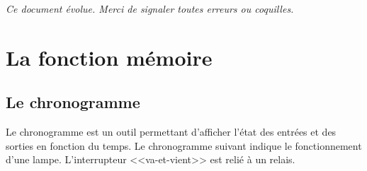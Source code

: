 \documentclass[10pt]{article}
\begin{document}

\setlength{\parskip}{0ex plus 0.2ex minus 0ex}
 \renewcommand{\contentsname}{}
 \renewcommand{\baselinestretch}{1}

\tableofcontents

 \renewcommand{\baselinestretch}{1.2}
\setlength{\parskip}{2ex plus 0.5ex minus 0.2ex}

\textit{Ce document évolue. Merci de signaler toutes erreurs ou coquilles.}

\section{La fonction mémoire}

\subsection{Le chronogramme}
Le chronogramme est un outil permettant d'afficher l'état des entrées et des sorties en fonction du temps. Le chronogramme suivant indique le fonctionnement d'une lampe. L'interrupteur <<va-et-vient>> est relié à un relais. 
\end{document}
